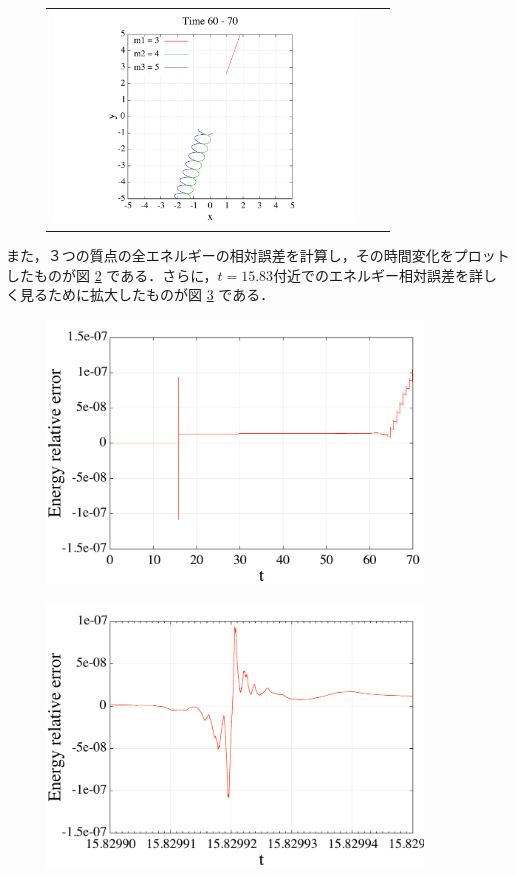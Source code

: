 \documentclass[11pt,a4paper,oneside,onecolumn]{jreport}
\begin{document}
\begin{figure}[H]
\begin{tabular}{ccc}
%
\begin{minipage}[t]{0.45\hsize}
\centering
\includegraphics[width=8cm]{./image/pythagoras_orbit_60to70.pdf}
\end{minipage}
\end{tabular}
\caption{\label{fig:pythagoras_orbit}}
\end{figure}

また，３つの質点の全エネルギーの相対誤差を計算し，その時間変化をプロットしたものが図 \ref{fig:pythagoras_E_error} である．さらに，$t = 15.83$付近でのエネルギー相対誤差を詳しく見るために拡大したものが図 \ref{fig:pythagoras_E_error_detail} である．




\begin{figure}[H]
\centering
\includegraphics[width=10cm]{./image/pythagoras_E_error.pdf}
\caption{\label{fig:pythagoras_E_error}}
\end{figure}

\begin{figure}[H]
\centering
\includegraphics[width=10cm]{./image/pythagoras_E_error_detail.pdf}
\caption{\label{fig:pythagoras_E_error_detail}}
\end{figure}
\end{document}
